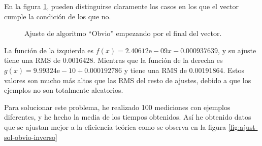 \documentclass[a4]{article}
\begin{document}
En la figura \ref{fig:ajust-obvio-inverso}, pueden distinguirse
claramente los casos en los que el vector cumple la condición de los
que no.

\begin{figure}[H]
  \centering
  \caption{Ajuste de algoritmo ``Obvio'' empezando por el final del
    vector.}
  \label{fig:ajust-obvio-inverso}
\end{figure}

La función de la izquierda es $f(x)=2.40612\mbox{e}-09x-0.000937639$,
y su ajuste tiene una RMS de 0.0016428. Mientras que la función de la
derecha es $g(x)=9.99324\mbox{e}-10+0.000192786$ y tiene una RMS de
0.00191864. Estos valores son mucho más altos que las RMS del resto de
ajustes, debido a que los ejemplos no son totalmente aleatorios.

Para solucionar este problema, he realizado 100 mediciones con
ejemplos diferentes, y he hecho la media de los tiempos obtenidos.
Así he obtenido datos que se ajustan mejor a la eficiencia teórica
como se observa en la figura \ref{fig:ajust-sol-obvio-inverso}
\end{document}
